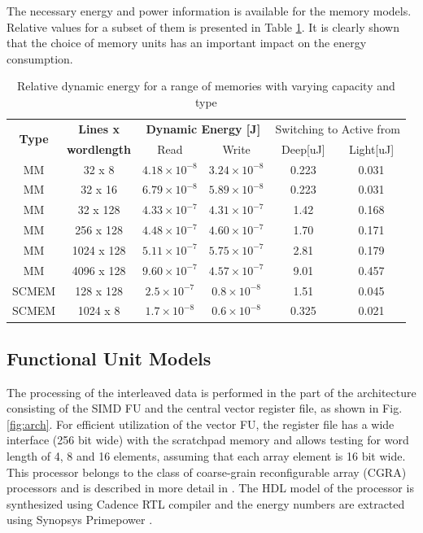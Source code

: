 The necessary energy and power information is available for the memory models. Relative values for a subset of them is presented in Table \ref{tab:models}. 
It is clearly shown that the choice of memory units has an important impact on the energy consumption.

\begin{table}
\caption{Relative dynamic energy for a range of memories with varying capacity and type}
\label{tab:models}{
	\begin{tabular}{|c|c|c|c|c|c|}
		\hline
		\multirow{2}{*}{\textbf{Type}} & \textbf{Lines x} & \multicolumn{2}{c|}{\textbf{Dynamic Energy [J]}} & \multicolumn{2}{c|}{Switching to Active from} \\ \cline{3-4}
		& \textbf{wordlength} & Read & Write  & Deep[uJ] & Light[uJ]\\ 
		\hline 
		MM & 32 x 8 &  $ 4.18 \times 10^{-8} $ &  $ 3.24 \times 10^{-8} $ & 0.223 &  0.031 \\ 
		\hline
		MM & 32 x 16 & $  6.79 \times 10^{-8} $ &  $ 5.89 \times 10^{-8} $ & 0.223 &  0.031\\ 
		\hline
		MM & 32 x 128 & $  4.33 \times 10^{-7} $ &  $ 4.31 \times 10^{-7} $ & 1.42 & 0.168\\ 
		\hline
		MM & 256 x 128 & $  4.48 \times 10^{-7} $ &  $ 4.60 \times 10^{-7} $ & 1.70 &  0.171\\ 
		\hline
		MM & 1024 x 128 & $  5.11 \times 10^{-7} $ &  $ 5.75 \times 10^{-7} $ & 2.81 & 0.179\\ 
		\hline
		MM & 4096 x 128 & $  9.60 \times 10^{-7} $ &  $ 4.57 \times 10^{-7} $ & 9.01 & 0.457\\ 
		\hline
		SCMEM & 128 x 128 & $  2.5 \times 10^{-7} $ &  $ 0.8 \times 10^{-8} $ & 1.51 &  0.045\\ 
		\hline
		SCMEM & 1024 x 8 & $  1.7 \times 10^{-8} $ &  $ 0.6 \times 10^{-8} $ & 0.325 &  0.021\\ 
		\hline
	\end{tabular}}	
\end{table}

\subsection{Functional Unit Models}

The processing of the interleaved data is performed in the part of the architecture consisting of the SIMD FU and the central vector register file, as shown in Fig.\ref{fig:arch}.
For efficient utilization of the vector FU, the register file has a wide interface (256 bit wide) with the scratchpad memory and allows testing for word length of 4, 8 and 16 elements, assuming that each array element is 16 bit wide.  
This processor belongs to the class of coarse-grain reconfigurable array (CGRA) processors and is described in more detail in \cite{lee2003compilation}.
The HDL model of the processor is synthesized using Cadence RTL compiler \cite{cadencecompiler} and the energy numbers are extracted using Synopsys Primepower \cite{kai2003synopsys}.

